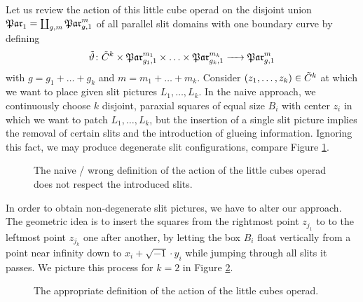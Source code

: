 Let us review the action of this little cube operad on the disjoint union $\mathfrak{Par}_1 = \coprod_{g,m} \mathfrak{Par}^m_{g,1}$ of all parallel slit domains with one boundary curve by defining
\[
    \tilde\vartheta \colon \cspc k \times \Par_{g_1,1}^{m_1} \times \ldots \times \Par_{g_k,1}^{m_k} \to \Par_{g,1}^m
\]
with $g = g_1 + \ldots + g_k$ and $m = m_1 + \ldots + m_k$.
Consider $(z_1, \ldots, z_k) \in \cspc k$ at which we want to place given slit pictures $L_1, \ldots, L_k$.
In the naive approach, we continuously choose $k$ disjoint, paraxial squares of equal size $B_i$ with center $z_i$ in which we want to patch $L_1, \ldots, L_k$, but
the insertion of a single slit picture implies the removal of certain slits and the introduction of glueing information.
Ignoring this fact, we may produce degenerate slit configurations, compare Figure \ref{homology_operations:parallel_patching_slit_pics:action_of_the_little_cube_operad_naive}.
\begin{figure}[ht]
    \centering
    \def\svgwidth{.4\columnwidth}
    
    \caption{\label{homology_operations:parallel_patching_slit_pics:action_of_the_little_cube_operad_naive}The naive / wrong definition of the action of the little cubes operad
        does not respect the introduced slits.}
\end{figure}
In order to obtain non-degenerate slit pictures, we have to alter our approach.
The geometric idea is to insert the squares from the rightmost point $z_{j_1}$ to to the leftmost point $z_{j_k}$ one after another, by
letting the box $B_i$ float vertically from a point near infinity down to $x_i + \sqrt{-1}\cdot y_i$ while jumping through all slits it passes.
We picture this process for $k=2$ in Figure \ref{homology_operations:parallel_patching_slit_pics:action_of_the_little_cube_operad}.
\begin{figure}[ht]
    \centering
    \def\svgwidth{.5\columnwidth}
    
    \caption{\label{homology_operations:parallel_patching_slit_pics:action_of_the_little_cube_operad}The appropriate definition of the action of the little cubes operad.}
\end{figure}

